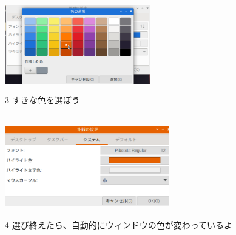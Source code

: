 \documentclass[a4paper,12pt]{jarticle}
\begin{document}
\begin{figure}
\begin{minipage}{\textwidth}
  \end{minipage}

  \begin{minipage}{\textwidth}

    \begin{minipage}{6.376cm}
      \includegraphics[width=6.347cm,height=4.084cm]{textbook-img1002.png}\\
      3 すきな色を選ぼう
    \end{minipage}
    \begin{minipage}{2.582cm}
    \end{minipage}
    \begin{minipage}{5.737cm}
      \includegraphics[width=7.145cm,height=4.451cm]{textbook-img1003.png}\\
      4 選び終えたら、自動的にウィンドウの色が変わっているよ
    \end{minipage}

  \end{minipage}

  \bigskip

\end{figure}


\bigskip

\clearpage
\end{document}
